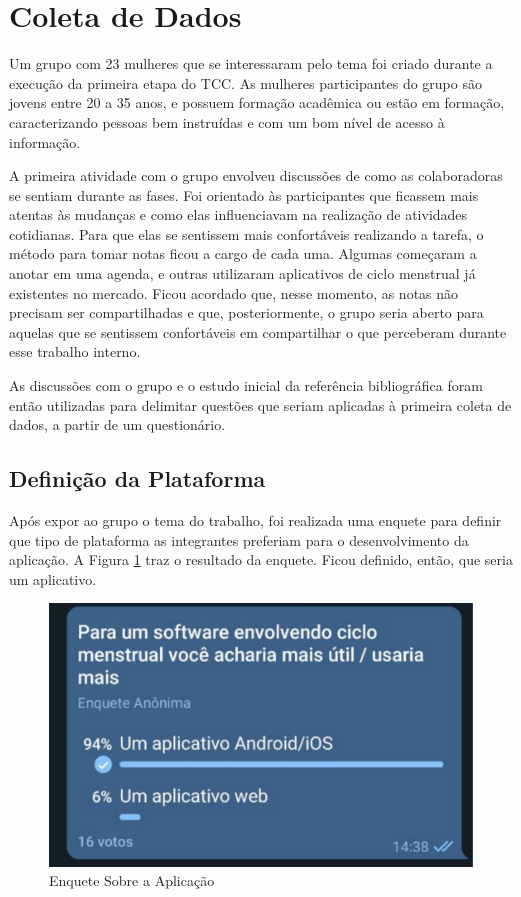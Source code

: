 \section{Coleta de Dados}
\label{coletadados}

Um grupo com 23 mulheres que se interessaram pelo tema foi criado durante a execução da primeira etapa do TCC. 
As mulheres participantes do grupo são jovens entre 20 a 35 anos, e possuem 
formação acadêmica ou estão em formação, caracterizando pessoas bem instruídas e com um bom 
nível de acesso à informação.

A primeira atividade com o grupo envolveu discussões de como as colaboradoras se sentiam durante as fases. Foi orientado
às participantes que ficassem mais atentas às mudanças e como elas influenciavam na realização de 
atividades cotidianas. Para que elas se sentissem mais confortáveis realizando a tarefa, o método para tomar notas ficou a cargo de cada uma. 
Algumas começaram a anotar em uma agenda, e outras utilizaram 
aplicativos de ciclo menstrual já existentes no mercado. Ficou acordado que, 
nesse momento, as notas não precisam ser compartilhadas e que, posteriormente, o grupo seria aberto para 
aquelas que se sentissem confortáveis em compartilhar o que perceberam 
durante esse trabalho interno.

As discussões com o grupo e o estudo inicial da referência bibliográfica foram então utilizadas para 
delimitar questões que seriam aplicadas à primeira coleta de dados, a partir de um questionário.

\subsection{Definição da Plataforma}

Após expor ao grupo o tema do trabalho, foi realizada uma enquete para definir que tipo de plataforma as 
integrantes preferiam para o desenvolvimento da aplicação. A Figura \ref{fig07} traz o resultado da enquete. 
Ficou definido, então, que seria um aplicativo.

\begin{figure}[ht]
	\caption{Enquete Sobre a Aplicação}
	\begin{center}
	\includegraphics[keepaspectratio=true,scale=0.3]{figuras/enqueteApp.pdf}
	\end{center}
    \label{fig07}
\end{figure}

